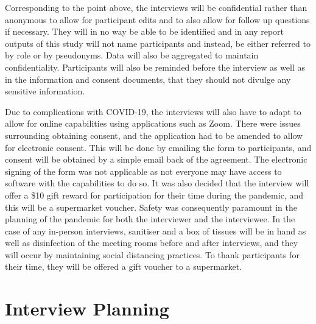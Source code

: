 \newline
\par Corresponding to the point above, the interviews will be confidential rather than anonymous to allow for participant edits and to also allow for follow up questions if necessary. They will in no way be able to be identified and in any report outputs of this study will not name participants and instead, be either referred to by role or by pseudonyms. Data will also be aggregated to maintain confidentiality. Participants will also be reminded before the interview as well as in the information and consent documents, that they should not divulge any sensitive information. 
\newline
\par Due to complications with COVID-19, the interviews will also have to adapt to allow for online capabilities using applications such as Zoom. There were issues surrounding obtaining consent, and the application had to be amended to allow for electronic consent. This will be done by emailing the form to participants, and consent will be obtained by a simple email back of the agreement. The electronic signing of the form was not applicable as not everyone may have access to software with the capabilities to do so. It was also decided that the interview will offer a \$10 gift reward for participation for their time during the pandemic, and this will be a supermarket voucher. Safety was consequently paramount in the planning of the pandemic for both the interviewer and the interviewee. In the case of any in-person interviews, sanitiser and a box of tissues will be in hand as well as disinfection of the meeting rooms before and after interviews, and they will occur by maintaining social distancing practices. To thank participants for their time, they will be offered a gift voucher to a supermarket.

\section{Interview Planning}

